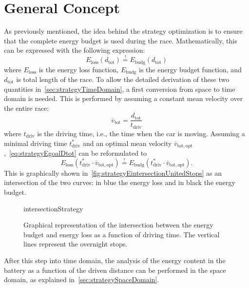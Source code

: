 \section{General Concept}
As previously mentioned, the idea behind the strategy optimization is to ensure that the complete energy budget is used during the race. Mathematically, this can be expressed with the following expression:
\begin{equation}
	E_\mathrm{loss}(d_\mathrm{tot}) \overset{!}{=} E_\mathrm{budg}(d_\mathrm{tot}) \label{eq:strategyEgoalDtot}
\end{equation}
where $E_\mathrm{loss}$ is the energy loss function, $E_\mathrm{budg}$ is the energy budget function, and $d_\mathrm{tot}$ is total length of the race. To allow the detailed derivation of these two quantities in~\cref{sec:strategyTimeDomain}, a first conversion from space to time domain is needed. This is performed by assuming a constant mean velocity over the entire race:
\begin{equation}
	\overline{v}_\mathrm{tot} = \frac{d_\mathrm{tot}}{t_\mathrm{driv}} \label{eq:strategyMeanVelTot}
\end{equation}
where $t_\mathrm{driv}$ is the driving time, i.e., the time when the car is moving. Assuming a minimal driving time $t_\mathrm{driv}^*$ and an optimal mean velocity $\overline{v}_\mathrm{tot,opt}$,~\cref{eq:strategyEgoalDtot} can be reformulated to
\begin{equation}
	E_\mathrm{loss}(t_\mathrm{driv}^* \cdot \overline{v}_\mathrm{tot,opt}) \overset{!}{=} E_\mathrm{budg}(t_\mathrm{driv}^* \cdot \overline{v}_\mathrm{tot,opt}).
\end{equation}
This is graphically shown in~\cref{fig:strategyEintersectionUnitedStops} as an intersection of the two curves: in blue the energy loss and in black the energy budget. 
\begin{figure}[htbp]
	\centering
	\begin{externalize}{intersectionStrategy}
			
		\end{externalize}
	\caption{Graphical representation of the intersection between the energy budget and energy loss as a function of driving time. The vertical lines represent the overnight stops.}
	\label{fig:strategyEintersection}
\end{figure}

After this step into time domain, the analysis of the energy content in the battery as a function of the driven distance can be performed in the space domain, as explained in~\cref{sec:strategySpaceDomain}.


